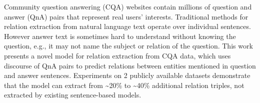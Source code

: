 Community question answering (CQA) websites contain millions of question and answer (QnA) pairs that represent real users' interests. Traditional methods for relation extraction from natural language text operate over individual sentences. However answer text is sometimes hard to understand without knowing the question, e.g., it may not name the subject or relation of the question. This work presents a novel model for relation extraction from CQA data, which uses discourse of QnA pairs to predict relations between entities mentioned in question and answer sentences. Experiments on 2 publicly available datasets demonstrate that the model can extract from {\textasciitilde}20\% to {\textasciitilde}40\% additional relation triples, not extracted by existing sentence-based models.
